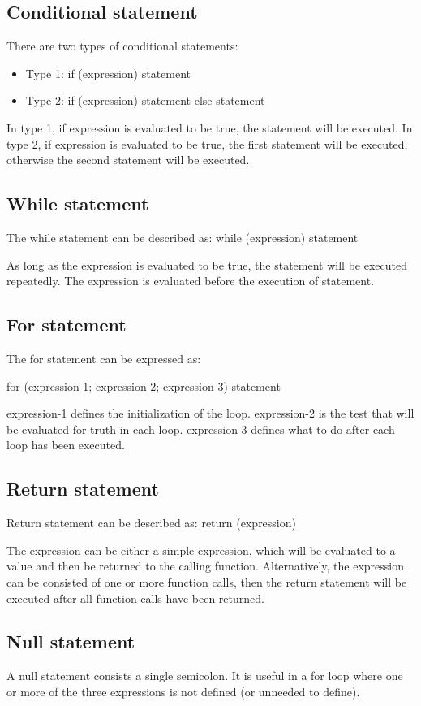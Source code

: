 \documentclass[a4paper,12pt]{article}
\begin{document}
\subsection{Conditional statement}
There are two types of conditional statements:

\begin{itemize}
\item Type 1: if (expression) statement
\item Type 2: if (expression) statement else statement
\end{itemize}
In type 1, if expression is evaluated to be true, the statement will be executed. In type 2, if expression is evaluated to be true, the first statement will be executed, otherwise the second statement will be executed.
\subsection{While statement}
The while statement can be described as: while (expression) statement

As long as the expression is evaluated to be true, the statement will be executed repeatedly. The expression is evaluated before the execution of statement.

\subsection{For statement}
The for statement can be expressed as: 

for (expression-1; expression-2; expression-3) statement

expression-1 defines the initialization of the loop. expression-2 is the test that will be evaluated for truth in each loop. expression-3 defines what to do after each loop has been executed.

\subsection{Return statement}
Return statement can be described as: return (expression)

The expression can be either a simple expression, which will be evaluated to a value and then be returned to the calling function. Alternatively, the expression can be consisted of one or more function calls, then the return statement will be executed after all function calls have been returned.

\subsection{Null statement}
A null statement consists a single semicolon. It is useful in a for loop where one or more of the three expressions is not defined (or unneeded to define).
\end{document}
